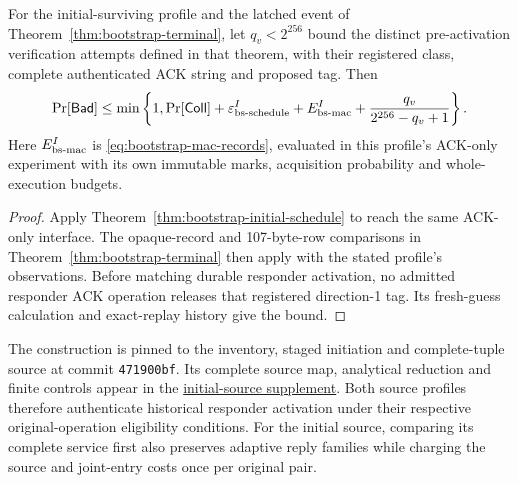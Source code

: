\begin{corollary}
\label{cor:bootstrap-initial-terminal}
For the initial-surviving profile and the latched event of
Theorem~\ref{thm:bootstrap-terminal}, let $q_v<2^{256}$ bound the distinct
pre-activation verification attempts defined in that theorem, with their
registered class, complete authenticated ACK string and proposed tag. Then
\[
 \Pr[\mathsf{Bad}]\le\min\left\{1,
  \Pr[\mathsf{Coll}]+\varepsilon^I_{\rm bs\text{-}schedule}
   +E^I_{\rm bs\text{-}mac}
   +\frac{q_v}{2^{256}-q_v+1}\right\}.
\]
Here $E^I_{\rm bs\text{-}mac}$ is
\eqref{eq:bootstrap-mac-records}, evaluated in this profile's ACK-only
experiment with its own immutable marks, acquisition probability and
whole-execution budgets.
\end{corollary}
\begin{proof}
Apply Theorem~\ref{thm:bootstrap-initial-schedule} to reach the same
ACK-only interface. The opaque-record and 107-byte-row comparisons in
Theorem~\ref{thm:bootstrap-terminal} then apply with the stated
profile's observations. Before matching durable responder activation,
no admitted responder ACK operation releases that registered direction-1
tag. Its fresh-guess calculation and exact-replay history give the bound.
\end{proof}

The construction is pinned to the inventory, staged initiation and
complete-tuple source at commit \texttt{471900bf}. Its complete source
map, analytical reduction and finite controls appear in the
\href{https://github.com/billlza/q-periapt/blob/81483b52a24a4cc81c2276c5a0d0b667c42761cd/docs/continuity/BOOTSTRAP_INITIAL_SOURCE_ADAPTER_V1.md}{initial-source supplement}.
Both source profiles therefore authenticate historical responder
activation under their respective original-operation eligibility
conditions. For the initial source, comparing its complete service first
also preserves adaptive reply families while charging the source and
joint-entry costs once per original pair.
